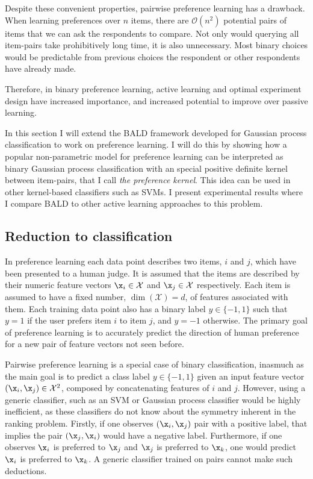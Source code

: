 Despite these convenient properties, pairwise preference learning has a drawback. When learning preferences over $n$ items, there are $\mathcal{O}(n^2)$ potential pairs of items that we can ask the respondents to compare. Not only would querying all item-pairs take prohibitively long time, it is also unnecessary. Most binary choices would be predictable from previous choices the respondent or other respondents have already made.

Therefore, in binary preference learning, active learning and optimal experiment design have increased importance, and increased potential to improve over passive learning.

In this section I will extend the BALD framework developed for Gaussian process classification to work on preference learning. I will do this by showing how a popular non-parametric model for preference learning can be interpreted as binary Gaussian process classification with an special positive definite kernel between item-pairs, that I call \emph{the preference kernel}. This idea can be used in other kernel-based classifiers such as SVMs. I present experimental results where I compare BALD to other active learning approaches to this problem.

\subsection{Reduction to classification\label{sec:prefKernel}}

In preference learning each data point describes two items, $i$ and $j$, which have been presented to a human judge. It is assumed that the items are described by their numeric feature vectors $\x_i\in\mathcal{X}$ and $\x_j\in\mathcal{X}$ respectively. Each item is assumed to have a fixed number, $\dim(\mathcal{X})=d$, of features associated with them. Each training data point also has a binary label $y\in\{-1,1\}$ such that $y=1$ if the user prefers item $i$ to item $j$, and $y=-1$ otherwise. The primary goal of preference learning is to accurately predict the direction of human preference for a new pair of feature vectors not seen before.

Pairwise preference learning is a special case of binary classification, inasmuch as the main goal is to predict a class label $y\in\{-1,1\}$ given an input feature vector $(\x_i,\x_j)\in\mathcal{X}^2$, composed by concatenating features of $i$ and $j$. However, using a generic classifier, such as an SVM or Gaussian process classifier would be highly inefficient, as these classifiers do not know about the symmetry inherent in the ranking problem. Firstly, if one observes $(\x_i,\x_j)$ pair with a positive label, that implies the pair $(\x_j,\x_i)$ would have a negative label. Furthermore, if one observes $\x_i$ is preferred to $\x_j$ and $\x_j$ is preferred to $\x_k$, one would predict $\x_i$ is preferred to $\x_k$. A generic classifier trained on pairs cannot make such deductions.

